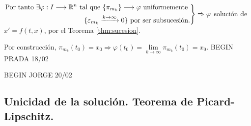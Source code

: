 \documentclass{article}
\makeatletter
\newenvironment{rcases}
{\left.\begin{aligned}}
	{\end{aligned}\right\rbrace}
\theoremstyle{theorem-style}  %
\theoremstyle{definition-style}
\theoremstyle{example-style}
\renewenvironment{proof}[1][\proofname]{\par
	\pushQED{\qed}%
	\normalfont \topsep6\p@\@plus6\p@\relax
	\list{}{%
		\settowidth{\leftmargin}{\quad:\hskip\labelsep}%
		\setlength{\labelwidth}{0pt}%
		\setlength{\itemindent}{-\leftmargin}%
	}%
	\item[\hskip\labelsep\itshape#1\@addpunct{:}]\ignorespaces
}{%
	\popQED\endlist\@endpefalse
}
\makeatother
\begin{document}
\begin{proof}
	$ \begin{rcases}
		\text{Por tanto } \exists \varphi: I\longrightarrow \mathbb{R}^n \text{ tal que } \{\pi_{m_k} \}\longrightarrow \varphi \text{ uniformemente }\\
		\{\varepsilon_{m_k}\xrightarrow{k\to \infty}0  \} \text{ por ser subsucesión.}
	\end{rcases} \Rightarrow \varphi$ solución de $ x'=f(t,x) $, por el Teorema \ref{thm:sucesion}.
	
	Por construcción, $ \pi_{m_k}(t_0)=x_0 \Rightarrow \varphi(t_0) = \lim\limits_{k\to \infty}\pi_{m_k}(t_0)=x_0$.
\end{proof}
BEGIN PRADA 18/02

BEGIN JORGE 20/02
\subsection{Unicidad de la solución. Teorema de Picard-Lipschitz.}
\end{document}
